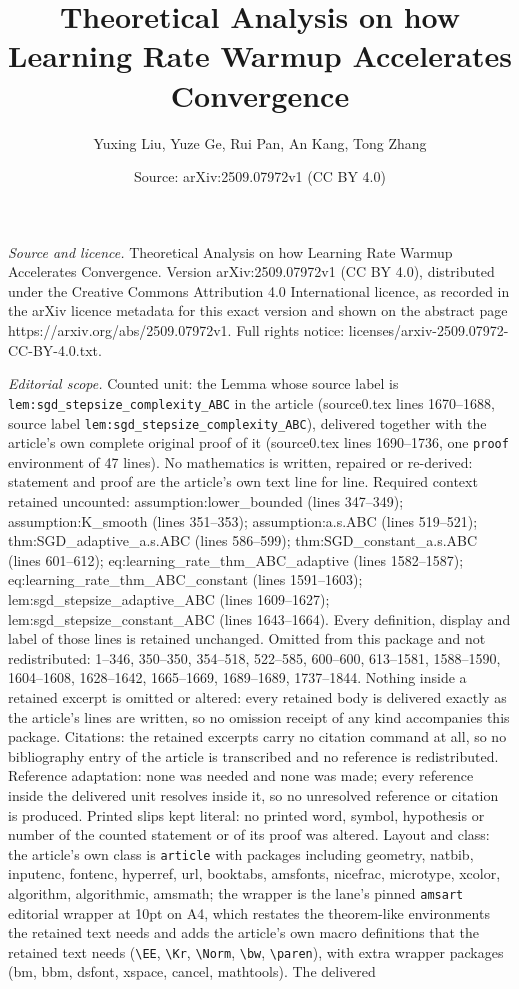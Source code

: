 \documentclass[10pt,a4paper]{amsart}
\title[Theoretical Analysis on how Learning Rate Warmup Accelerates]{Theoretical Analysis on how Learning Rate Warmup Accelerates Convergence}
\author{Yuxing Liu, Yuze Ge, Rui Pan, An Kang, Tong Zhang}
\date{Source: arXiv:2509.07972v1 (CC BY 4.0)}
\begin{document}
\maketitle

\noindent\emph{Source and licence.} Theoretical Analysis on how Learning Rate Warmup Accelerates Convergence. Version arXiv:2509.07972v1 (CC BY 4.0), distributed under the Creative Commons Attribution 4.0 International licence, as recorded in the arXiv licence metadata for this exact version and shown on the abstract page https://arxiv.org/abs/2509.07972v1. Full rights notice: licenses/arxiv-2509.07972-CC-BY-4.0.txt.\par\smallskip

\noindent\textit{Editorial scope.} Counted unit: the Lemma whose source label is \texttt{lem:sgd\_stepsize\_complexity\_ABC} in the article (source0.tex lines 1670--1688, source label \texttt{lem:sgd\_stepsize\_complexity\_ABC}), delivered together with the article's own complete original proof of it (source0.tex lines 1690--1736, one \texttt{proof} environment of 47 lines). No mathematics is written, repaired or re-derived: statement and proof are the article's own text line for line. Required context retained uncounted: assumption:lower\_bounded (lines 347--349); assumption:K\_smooth (lines 351--353); assumption:a.s.ABC (lines 519--521); thm:SGD\_adaptive\_a.s.ABC (lines 586--599); thm:SGD\_constant\_a.s.ABC (lines 601--612); eq:learning\_rate\_thm\_ABC\_adaptive (lines 1582--1587); eq:learning\_rate\_thm\_ABC\_constant (lines 1591--1603); lem:sgd\_stepsize\_adaptive\_ABC (lines 1609--1627); lem:sgd\_stepsize\_constant\_ABC (lines 1643--1664). Every definition, display and label of those lines is retained unchanged. Omitted from this package and not redistributed: 1--346, 350--350, 354--518, 522--585, 600--600, 613--1581, 1588--1590, 1604--1608, 1628--1642, 1665--1669, 1689--1689, 1737--1844. Nothing inside a retained excerpt is omitted or altered: every retained body is delivered exactly as the article's lines are written, so no omission receipt of any kind accompanies this package. Citations: the retained excerpts carry no citation command at all, so no bibliography entry of the article is transcribed and no reference is redistributed. Reference adaptation: none was needed and none was made; every reference inside the delivered unit resolves inside it, so no unresolved reference or citation is produced. Printed slips kept literal: no printed word, symbol, hypothesis or number of the counted statement or of its proof was altered. Layout and class: the article's own class is \texttt{article} with packages including geometry, natbib, inputenc, fontenc, hyperref, url, booktabs, amsfonts, nicefrac, microtype, xcolor, algorithm, algorithmic, amsmath; the wrapper is the lane's pinned \texttt{amsart} editorial wrapper at 10pt on A4, which restates the theorem-like environments the retained text needs and adds the article's own macro definitions that the retained text needs (\texttt{\textbackslash EE}, \texttt{\textbackslash Kr}, \texttt{\textbackslash Norm}, \texttt{\textbackslash bw}, \texttt{\textbackslash paren}), with extra wrapper packages (bm, bbm, dsfont, xspace, cancel, mathtools). The delivered 
\end{document}

